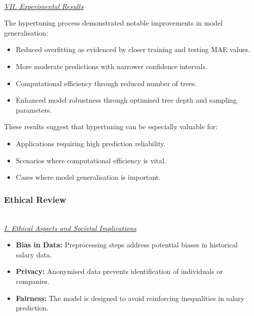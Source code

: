 \documentclass[11pt,a4paper]{article}
\newcommand{\subsubsubsection}[1]{
  {\setlength\itemindent{13pt} \textit{\uline{\\#1\\}}} 
}
\begin{document}
\subsubsubsection{VII. Experimental Results}
The hypertuning process demonstrated notable improvements in model generalisation:
\begin{itemize}
\item Reduced overfitting as evidenced by closer training and testing MAE values.
\item More moderate predictions with narrower confidence intervals.
\item Computational efficiency through reduced number of trees.
\item Enhanced model robustness through optimised tree depth and sampling parameters.
\end{itemize}
These results suggest that hypertuning can be especially valuable for:
\begin{itemize}
\item Applications requiring high prediction reliability.
\item Scenarios where computational efficiency is vital.
\item Cases where model generalisation is important.
\end{itemize}

\subsubsection{Ethical Review}
\subsubsubsection{I. Ethical Aspects and Societal Implications}
\begin{itemize}
\item \textbf{Bias in Data:} Preprocessing steps address potential biases in historical salary data.
\item \textbf{Privacy:} Anonymised data prevents identification of individuals or companies.
\item \textbf{Fairness:} The model is designed to avoid reinforcing inequalities in salary prediction.
\end{itemize}
\end{document}
